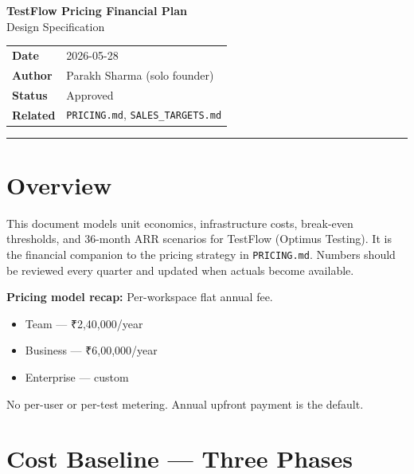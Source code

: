 \documentclass[12pt,a4paper]{article}
\begin{document}

\begin{center}
  {\LARGE\bfseries TestFlow Pricing Financial Plan}\\[0.5em]
  {\large\color{accent} Design Specification}\\[1.5em]
  \begin{tabular}{ll}
    \textbf{Date}    & 2026-05-28 \\
    \textbf{Author}  & Parakh Sharma (solo founder) \\
    \textbf{Status}  & Approved \\
    \textbf{Related} & \texttt{PRICING.md}, \texttt{SALES\_TARGETS.md} \\
  \end{tabular}
\end{center}
\vspace{1em}
\hrule
\vspace{1.5em}

\section{Overview}

This document models unit economics, infrastructure costs, break-even thresholds,
and 36-month ARR scenarios for TestFlow (Optimus Testing). It is the financial
companion to the pricing strategy in \texttt{PRICING.md}. Numbers should be
reviewed every quarter and updated when actuals become available.

\textbf{Pricing model recap:} Per-workspace flat annual fee.
\begin{itemize}[noitemsep]
  \item Team --- ₹2,40,000/year
  \item Business --- ₹6,00,000/year
  \item Enterprise --- custom
\end{itemize}
No per-user or per-test metering. Annual upfront payment is the default.

\section{Cost Baseline --- Three Phases}
\end{document}

